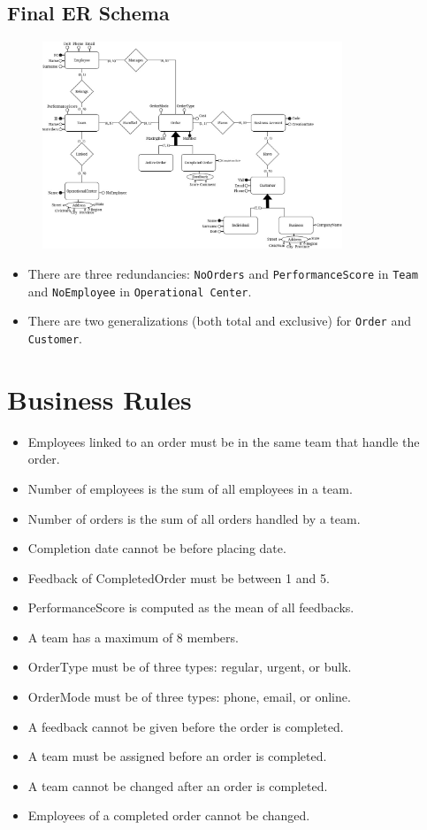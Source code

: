 \subsection*{Final ER Schema}
\begin{figure}[H]
    \centering
    \includegraphics[width=0.8\textwidth]{img/ER.jpg}
\end{figure}

\begin{itemize}[label=-]
    \item There are three redundancies: \texttt{NoOrders} and \texttt{PerformanceScore} in \texttt{Team} \\ and \texttt{NoEmployee} in \texttt{Operational Center}.
    \item There are two generalizations (both total and exclusive) for \texttt{Order} and \texttt{Customer}.
\end{itemize}

\section*{Business Rules}
\begin{itemize}
    \item Employees linked to an order must be in the same team that handle the order.
    \item Number of employees is the sum of all employees in a team.
    \item Number of orders is the sum of all orders handled by a team.
    \item Completion date cannot be before placing date.
    \item Feedback of CompletedOrder must be between 1 and 5.
    \item PerformanceScore is computed as the mean of all feedbacks.
    \item A team has a maximum of 8 members.
    \item OrderType must be of three types: regular, urgent, or bulk.
    \item OrderMode must be of three types: phone, email, or online.
    \item A feedback cannot be given before the order is completed.
    \item A team must be assigned before an order is completed.
    \item A team cannot be changed after an order is completed.
    \item Employees of a completed order cannot be changed.
\end{itemize}

